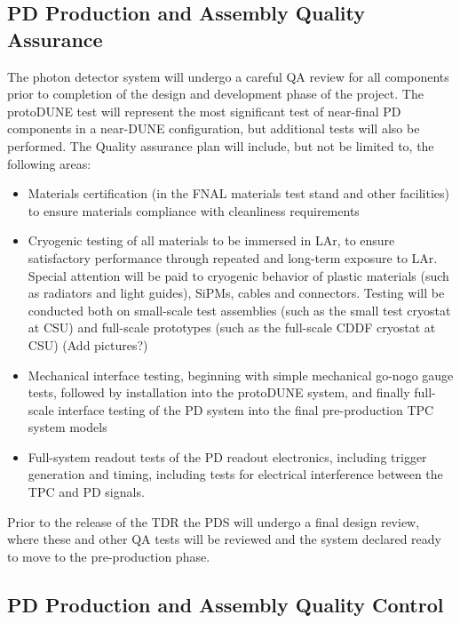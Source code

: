\subsection{PD Production and Assembly Quality Assurance}
\label{sec:fdsp-pd-prodqa}

The photon detector system will undergo a careful QA review for all components prior to completion of the design and development phase of the project.  The protoDUNE test will represent the most significant test of near-final PD components in a near-DUNE configuration, but additional tests will also be performed.  The Quality assurance plan will include, but not be limited to, the following areas:

\begin{itemize}
\item Materials certification (in the FNAL materials test stand and other facilities) to ensure materials compliance with cleanliness requirements
\item Cryogenic testing of all materials to be immersed in LAr, to ensure satisfactory performance through repeated and long-term exposure to LAr.  Special attention will be paid to cryogenic behavior of plastic materials (such as radiators and light guides), SiPMs, cables and connectors.  Testing will be conducted both on small-scale test assemblies (such as the small test cryostat at CSU) and full-scale prototypes (such as the full-scale CDDF cryostat at CSU) (Add pictures?)
\item Mechanical interface testing, beginning with simple mechanical go-nogo gauge tests, followed by installation into the protoDUNE system, and finally full-scale interface testing of the PD system into the final pre-production TPC system models
\item Full-system readout tests of the PD readout electronics, including trigger generation and timing, including tests for electrical interference between the TPC and PD signals.
\end{itemize}

Prior to the release of the TDR the PDS will undergo a final design review, where these and other QA tests will be reviewed and the system declared ready to move to the pre-production phase.


\subsection{PD Production and Assembly Quality Control}
\label{sec:fdsp-pd-prodqc}

